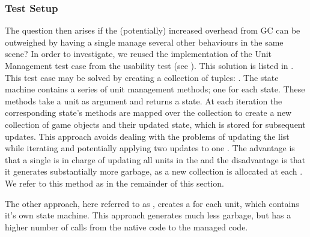 \subsubsection{Test Setup}
The question then arises if the (potentially) increased overhead from \gls{GC} can be outweighed by having a single  manage several other behaviours in the same scene? In order to investigate, we reused the implementation of the Unit Management test case from the usability test (see ). This solution is listed in . This test case may be solved by creating a collection of tuples: . The state machine contains a series of unit management methods; one for each state. These methods take a unit as argument and returns a state. At each iteration the corresponding state's methods are mapped over the collection to create a new collection of game objects and their updated state, which is stored for subsequent updates. This approach avoids dealing with the problems of updating the list while iterating and potentially applying two updates to one . The advantage is that a single  is in charge of updating all units in the  and the disadvantage is that it generates substantially more garbage, as a new collection is allocated at each . We refer to this method as  in the remainder of this section.

The other approach, here referred to as , creates a  for each unit, which contains it's own state machine. This approach generates much less garbage, but has a higher number of calls from the native code to the managed code.

